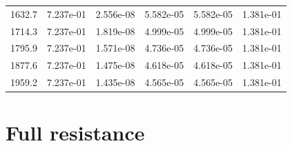 \documentclass{report}
\begin{document}
\begin{table}[htbp]
\begin{tabular}{lccccc}
1632.7 & 7.237e-01 & 2.556e-08 & 5.582e-05 & 5.582e-05 & 1.381e-01 \\
1714.3 & 7.237e-01 & 1.819e-08 & 4.999e-05 & 4.999e-05 & 1.381e-01 \\
1795.9 & 7.237e-01 & 1.571e-08 & 4.736e-05 & 4.736e-05 & 1.381e-01 \\
1877.6 & 7.237e-01 & 1.475e-08 & 4.618e-05 & 4.618e-05 & 1.381e-01 \\
1959.2 & 7.237e-01 & 1.435e-08 & 4.565e-05 & 4.565e-05 & 1.381e-01 \\
\bottomrule
\end{tabular}
\end{table}

\newpage
\section{Full resistance}
\end{document}
